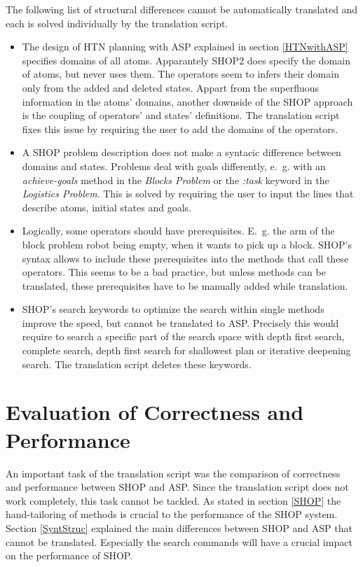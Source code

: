 \documentclass[10pt,a4paper]{article}
\begin{document}
The following list of structural differences cannot be automatically translated and each is solved individually by the translation script.
\begin{itemize}

\item The design of HTN planning with ASP explained in section \ref{HTNwithASP} specifies domains of all atoms. Apparantely SHOP2 does specify the domain of atoms, but never uses them. The operators seem to infers their domain only from the added and deleted states. Appart from the superfluous information in the atoms' domains, another downside of the SHOP approach is the coupling of operators' and states' definitions. The translation script fixes this issue by requiring the user to add the domains of the operators.

\item A SHOP problem description does not make a syntacic difference between domains and states. Problems deal with goals differently, e.~g. with an \textit{achieve-goals} method in the \textit{Blocks Problem} or the \textit{:task} keyword in the \textit{Logistics Problem}. This is solved by requiring the user to input the lines that describe atoms, initial states and goals.

\item Logically, some operators should have prerequisites. E.~g. the arm of the block problem robot being empty, when it wants to pick up a block. SHOP's syntax allows to include these prerequisites into the methods that call these operators. This seems to be a bad practice, but unless methods can be translated, these prerequisites have to be manually added while translation.

\item SHOP's search keywords to optimize the search within single methods improve the speed, but cannot be translated to ASP. Precisely this would require to search a specific part of the search space with depth first search, complete search, depth first search for shallowest plan or iterative deepening search. The translation script deletes these keywords.

\end{itemize}




\section{Evaluation of Correctness and Performance}\label{Eval}
An important task of the translation script was the comparison of correctness and performance between SHOP and ASP. Since the translation script does not work completely, this task cannot be tackled. As stated in section \ref{SHOP} the hand-tailoring of methods is crucial to the performance of the SHOP system. Section \ref{SyntStruc} explained the main differences between SHOP and ASP that cannot be translated. Especially the search commands will have a crucial impact on the performance of SHOP.
\end{document}
